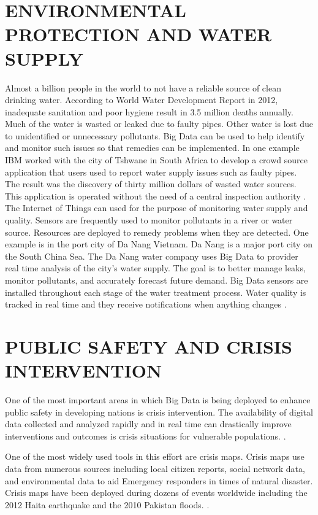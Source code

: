 \documentclass[sigconf]{acmart}
\begin{document}
\section{ENVIRONMENTAL PROTECTION AND WATER SUPPLY}

Almost a billion people in the world to not have a reliable source of clean drinking water. According to World Water Development Report in 2012,  inadequate sanitation and poor hygiene result in  3.5 million deaths annually. Much of the water is wasted or leaked due to faulty pipes. Other water is lost due to unidentified or unnecessary pollutants. Big Data can be used to help identify and monitor such issues so that remedies can be implemented.  
In one example IBM worked with the city of Tshwane in South Africa to develop a crowd source application that users used to report water supply issues such as faulty pipes. The result was the discovery of thirty million dollars of wasted water sources. This application is operated without the need of a central inspection authority \cite{www-google-Hffpst}.
The Internet of Things can used for the purpose of monitoring water supply and quality. Sensors are frequently used to monitor pollutants in a river or water source. Resources are deployed to remedy problems when they are detected.  One example is in the port city of Da Nang Vietnam. Da Nang is a major port city on the South China Sea. The Da Nang water company uses Big Data to provider real time analysis of the city’s water supply. The goal is to better manage leaks, monitor pollutants, and accurately forecast future demand. Big Data sensors are installed throughout each stage of the water treatment process. Water quality is tracked in real time and they receive notifications when anything changes \cite{DevEcon}.

\section{PUBLIC SAFETY AND CRISIS INTERVENTION}

One of the most important areas in which Big Data is being deployed to enhance public safety in developing nations is crisis intervention. The availability of digital data collected and analyzed rapidly and in real time can drastically improve interventions and outcomes is crisis situations for vulnerable populations.  \cite{www-google-GloPls}.  

One of the most widely used tools in this effort are crisis maps. Crisis maps use data from numerous sources including local citizen reports, social network data, and environmental data to aid Emergency responders in times of natural disaster. Crisis maps have been deployed during dozens of events worldwide including the 2012 Haita earthquake and the 2010 Pakistan floods. \cite{www-google-Hffpst}.
\end{document}
